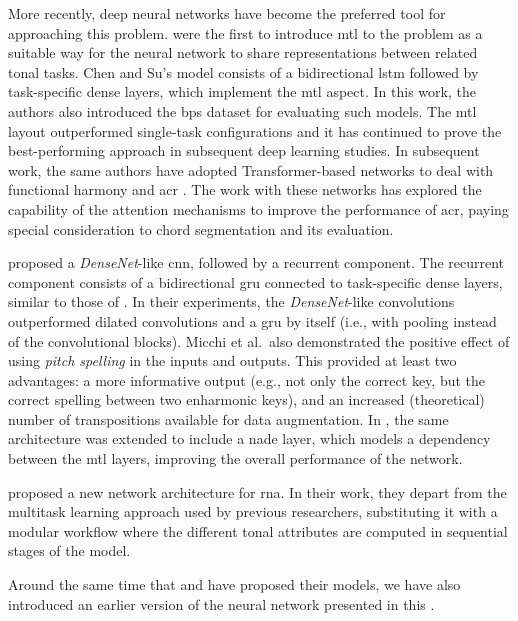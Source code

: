 More recently, deep neural networks have become the
preferred tool for approaching this problem.
\textcite{chen2018functional} were the first to introduce
\gls{mtl} \parencite{ruder2017overview} to the problem as a
suitable way for the neural network to share representations
between related tonal tasks. Chen and Su's model consists of
a bidirectional \gls{lstm} \parencite{hochreiter1997long}
followed by task-specific dense layers, which implement the
\gls{mtl} aspect. In this work, the authors also introduced
the \gls{bps} dataset for evaluating such models. The
\gls{mtl} layout outperformed single-task configurations and
it has continued to prove the best-performing approach in
subsequent deep learning studies. In subsequent work, the
same authors have adopted Transformer-based networks to deal
with functional harmony and \gls{acr}
\parencite{chen2019harmony, chen2021attend}. The work with
these networks has explored the capability of the attention
mechanisms to improve the performance of \gls{acr}, paying
special consideration to chord segmentation and its
evaluation.

\textcite{micchi2020not} proposed a \emph{DenseNet}-like
\parencite{huang2017densely} \gls{cnn}, followed by a
recurrent component. The recurrent component consists of a
bidirectional \gls{gru} \parencite{cho2014learning}
connected to task-specific dense layers, similar to those of
\textcite{chen2018functional}. In their experiments, the
\emph{DenseNet}-like convolutions outperformed dilated
convolutions and a \gls{gru} by itself (i.e., with pooling
instead of the convolutional blocks). Micchi et al.~also
demonstrated the positive effect of using \emph{pitch
spelling} in the inputs and outputs. This provided at least
two advantages: a more informative output (e.g., not only
the correct key, but the correct spelling between two
enharmonic keys), and an increased (theoretical) number of
transpositions available for data augmentation. In
\textcite{micchi2021deep}, the same architecture was
extended to include a \gls{nade} layer, which models a
dependency between the \gls{mtl} layers, improving the
overall performance of the network.

\textcite{mcleod2021modular} proposed a new network
architecture for \gls{rna}. In their work, they depart from
the multitask learning approach used by previous
researchers, substituting it with a modular workflow where
the different tonal attributes are computed in sequential
stages of the model.

Around the same time that \textcite{micchi2021deep} and
\textcite{mcleod2021modular} have proposed their models, we
have also introduced an earlier version of the neural
network presented in this \thesisdiss{}
\parencite{napoleslopez2021augmentednet}.
